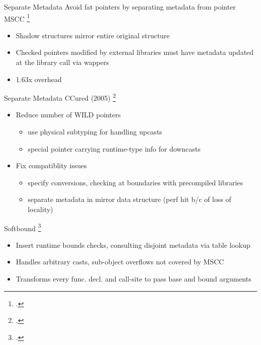 \documentclass[aspectratio=169]{beamer}
\begin{document}
\begin{frame}[fragile]{Separate Metadata}
Avoid fat pointers by \alert{separating metadata} from pointer %
\\
MSCC \footcite{xu_efficient_2004}
    \begin{itemize}
        \item Shadow structures mirror entire original structure %
        \item Checked pointers modified by external libraries must have metadata updated at the library call via wappers
        \item 1.63x overhead
    \end{itemize}
\end{frame}


\begin{frame}{Separate Metadata}
CCured (2005) \footcite{necula_ccured:_2005} %
    \begin{itemize}
        \item Reduce number of WILD pointers
            \begin{itemize}
                \item use physical subtyping for handling upcasts
                \item special pointer carrying runtime-type info for downcasts
            \end{itemize}
        \item Fix compatiblity issues
            \begin{itemize}
                \item specify conversions, checking at boundaries with precompiled libraries
                \item separate metadata in mirror data structure (perf hit b/c of loss of locality)
            \end{itemize}
    \end{itemize}
Softbound \footcite{nagarakatte_softbound:_2009}
    \begin{itemize}
        \item Insert runtime bounds checks, consulting disjoint metadata via table lookup
        \item Handles arbitrary casts, sub-object overflows not covered by MSCC %
        \item Transforms every func. decl. and call-site to pass base and bound arguments %
    \end{itemize}
\vspace{0.2in}
\end{frame}
\end{document}
